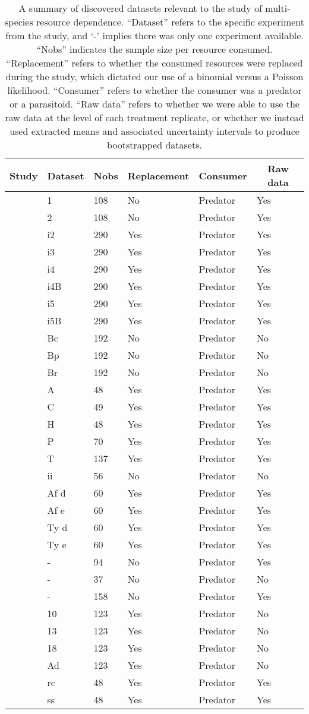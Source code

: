 \begin{table}[!tbp]
\caption{
      A summary of discovered datasets relevant to the study of multi-species resource dependence.
      ``Dataset'' refers to the specific experiment from the study, and `-' implies there was only one experiment available.
      ``Nobs'' indicates the sample size per resource consumed.
      ``Replacement'' refers to whether the consumed resources were replaced during the study, which dictated our use of a binomial versus a Poisson likelihood.
      ``Consumer'' refers to whether the consumer was a predator or a parasitoid.
      ``Raw data'' refers to whether we were able to use the raw data at the level of each treatment replicate, or whether we instead used extracted means and associated uncertainty intervals to produce bootstrapped datasets.
    \label{table:1pred2preydatasets}} 
\begin{center}
\begin{tabular}{llllll}
\hline\hline
\multicolumn{1}{c}{Study}&\multicolumn{1}{c}{Dataset}&\multicolumn{1}{c}{Nobs}&\multicolumn{1}{c}{Replacement}&\multicolumn{1}{c}{Consumer}&\multicolumn{1}{c}{Raw data}\tabularnewline
\hline
\citet{Colton:1987aa}&1&108&No&Predator&Yes\tabularnewline
\citet{Colton:1987aa}&2&108&No&Predator&Yes\tabularnewline
\citet{Elliott:2006aa}&i2&290&Yes&Predator&Yes\tabularnewline
\citet{Elliott:2006aa}&i3&290&Yes&Predator&Yes\tabularnewline
\citet{Elliott:2006aa}&i4&290&Yes&Predator&Yes\tabularnewline
\citet{Elliott:2006aa}&i4B&290&Yes&Predator&Yes\tabularnewline
\citet{Elliott:2006aa}&i5&290&Yes&Predator&Yes\tabularnewline
\citet{Elliott:2006aa}&i5B&290&Yes&Predator&Yes\tabularnewline
\citet{Iyer:1996aa}&Bc&192&No&Predator&No\tabularnewline
\citet{Iyer:1996aa}&Bp&192&No&Predator&No\tabularnewline
\citet{Iyer:1996aa}&Br&192&No&Predator&No\tabularnewline
\citet{Kalinkat:2011bd}&A&48&Yes&Predator&Yes\tabularnewline
\citet{Kalinkat:2011bd}&C&49&Yes&Predator&Yes\tabularnewline
\citet{Kalinkat:2011bd}&H&48&Yes&Predator&Yes\tabularnewline
\citet{Kalinkat:2011bd}&P&70&Yes&Predator&Yes\tabularnewline
\citet{Kalinkat:2011bd}&T&137&Yes&Predator&Yes\tabularnewline
\citet{Krylov:1992aa}&ii&56&No&Predator&No\tabularnewline
\citet{Lester:2002aa}&Af d&60&Yes&Predator&Yes\tabularnewline
\citet{Lester:2002aa}&Af e&60&Yes&Predator&Yes\tabularnewline
\citet{Lester:2002aa}&Ty d&60&Yes&Predator&Yes\tabularnewline
\citet{Lester:2002aa}&Ty e&60&Yes&Predator&Yes\tabularnewline
\citet{Long:2012ab}&-&94&No&Predator&Yes\tabularnewline
\citet{Mattila:1998aa}&-&37&No&Predator&No\tabularnewline
\citet{Nachappa:2006aa}&-&158&No&Predator&Yes\tabularnewline
\citet{Ranta:1985aa}&10&123&Yes&Predator&No\tabularnewline
\citet{Ranta:1985aa}&13&123&Yes&Predator&No\tabularnewline
\citet{Ranta:1985aa}&18&123&Yes&Predator&No\tabularnewline
\citet{Ranta:1985aa}&Ad&123&Yes&Predator&No\tabularnewline
\citet{Wong:2005aa}&rc&48&Yes&Predator&Yes\tabularnewline
\citet{Wong:2005aa}&ss&48&Yes&Predator&Yes\tabularnewline
\hline
\end{tabular}\end{center}
\end{table}
